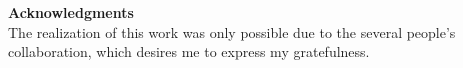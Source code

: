 
\noindent \textbf{Acknowledgments} \\[6mm]
The realization of this work was only possible due to the several people’s collaboration, which desires me to express my gratefulness.

\lipsum[2]

    \vfill \strut

